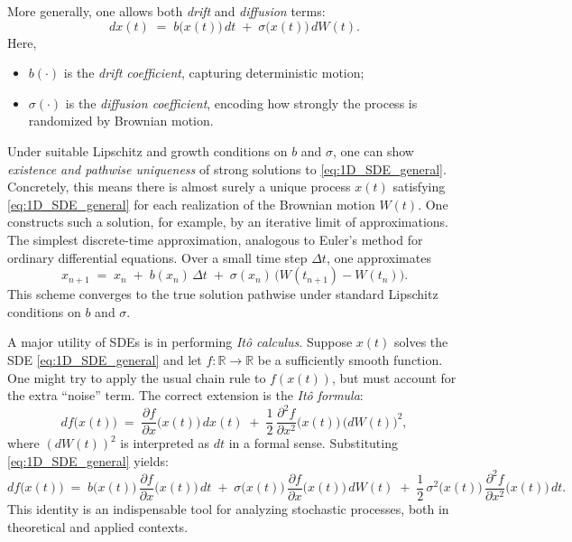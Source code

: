 \documentclass[letterpaper,11pt,oneside,reqno]{article}
\numberwithin{equation}{section}
\theoremstyle{definition}
\begin{document}
\medskip
More generally, one allows both \emph{drift} and \emph{diffusion} terms:
\begin{equation}
\label{eq:1D_SDE_general}
dx(t) \;=\; b\bigl(x(t)\bigr)\,dt \;+\; \sigma\bigl(x(t)\bigr)\,dW(t).
\end{equation}
Here,
\begin{itemize}
\item \(b(\cdot)\) is the \emph{drift coefficient}, capturing deterministic motion;
\item \(\sigma(\cdot)\) is the \emph{diffusion coefficient}, encoding how strongly the process is randomized by Brownian motion.
\end{itemize}
Under suitable Lipschitz and growth conditions on \(b\) and \(\sigma\), one can show \emph{existence and pathwise uniqueness} of strong solutions to \eqref{eq:1D_SDE_general}. Concretely, this means there is almost surely a unique process \(x(t)\) satisfying \eqref{eq:1D_SDE_general} for each realization of the Brownian motion \(W(t)\). One constructs such a solution, for example, by an iterative limit of approximations.
The simplest discrete-time approximation, analogous to Euler’s method for ordinary differential equations. Over a small time step \(\Delta t\), one approximates
\[
x_{n+1} \;=\; x_n \;+\; b(x_n)\,\Delta t \;+\; \sigma(x_n)\,\bigl(W(t_{n+1}) - W(t_n)\bigr).
\]
This scheme converges to the true solution pathwise under standard Lipschitz conditions on \(b\) and \(\sigma\).


\medskip
A major utility of SDEs is in performing \emph{Itô calculus}. Suppose \(x(t)\) solves the SDE \eqref{eq:1D_SDE_general} and let \(f\colon\mathbb{R}\to\mathbb{R}\) be a sufficiently smooth function. One might try to apply the usual chain rule to \(f(x(t))\), but must account for the extra “noise” term. The correct extension is the \emph{Itô formula}:
\[
df\bigl(x(t)\bigr)
\;=\;
\frac{\partial f}{\partial x}\bigl(x(t)\bigr)\,dx(t)
\;+\;\frac12\,
\frac{\partial^2 f}{\partial x^2}\bigl(x(t)\bigr)\,\bigl(dW(t)\bigr)^2,
\]
where \((dW(t))^2\) is interpreted as \(dt\) in a formal sense. Substituting \eqref{eq:1D_SDE_general} yields:
\[
df\bigl(x(t)\bigr)
\;=\;
b\bigl(x(t)\bigr)\,\frac{\partial f}{\partial x}\bigl(x(t)\bigr)\,dt
\;+\;
\sigma\bigl(x(t)\bigr)\,\frac{\partial f}{\partial x}\bigl(x(t)\bigr)\,dW(t)
\;+\;
\frac12\,\sigma^2\bigl(x(t)\bigr)\,\frac{\partial^2 f}{\partial x^2}\bigl(x(t)\bigr)\,dt.
\]
This identity is an indispensable tool for analyzing stochastic processes, both in theoretical and applied contexts.
\end{document}
